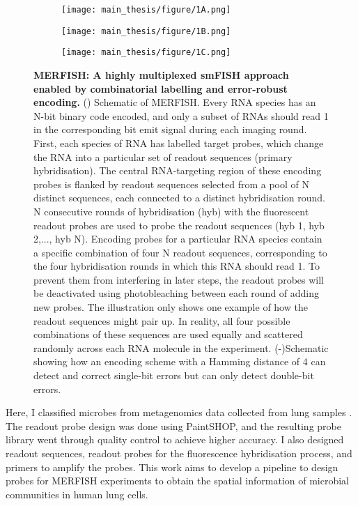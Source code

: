 \documentclass[10pt,letterpaper]{article}
\begin{document}
\begin{figure}
    \centering
    \begin{subfigure}[t]{\textwidth}
        \caption{}
        \centering
        \texttt{[image: main\_thesis/figure/1A.png]} 
        \label{fig1A}
    \end{subfigure}
    \begin{subfigure}[t]{0.45\textwidth}
            \caption{}
            \centering
            \label{fig1B}
            \texttt{[image: main\_thesis/figure/1B.png]} 
            
    \end{subfigure}
    \begin{subfigure}[t]{0.45\textwidth}
        \centering
        \caption{}
        \texttt{[image: main\_thesis/figure/1C.png]} 
        \label{fig1C}
    \end{subfigure}
    
    \caption{\textbf{MERFISH: A highly multiplexed smFISH approach enabled by combinatorial labelling and error-robust encoding.} (\textbf{}) Schematic of MERFISH. Every RNA species has an N-bit binary code encoded, and only a subset of RNAs should read 1 in the corresponding bit emit signal during each imaging round. First, each species of RNA has labelled target probes, which change the RNA into a particular set of readout sequences (primary hybridisation). The central RNA-targeting region of these encoding probes is flanked by readout sequences selected from a pool of N distinct sequences, each connected to a distinct hybridisation round. N consecutive rounds of hybridisation (hyb) with the fluorescent readout probes are used to probe the readout sequences (hyb 1, hyb 2,..., hyb N). Encoding probes for a particular RNA species contain a specific combination of four N readout sequences, corresponding to the four hybridisation rounds in which this RNA should read 1. To prevent them from interfering in later steps, the readout probes will be deactivated using photobleaching between each round of adding new probes. The illustration only shows one example of how the readout sequences might pair up. In reality, all four possible combinations of these sequences are used equally and scattered randomly across each RNA molecule in the experiment.  (\textbf{}-\textbf{})Schematic showing how an encoding scheme with a Hamming distance of 4 can detect and correct single-bit errors but can only detect double-bit errors.}
\end{figure}
\pagebreak
\noindent Here, I classified microbes from metagenomics data collected from lung samples \parencite{campos-2023}. The readout probe design was done using PaintSHOP, and the resulting probe library went through quality control to achieve higher accuracy. I also designed readout sequences, readout probes for the fluorescence hybridisation process, and primers to amplify the probes. This work aims to develop a pipeline to design probes for MERFISH experiments to obtain the spatial information of microbial communities in human lung cells.
\end{document}
